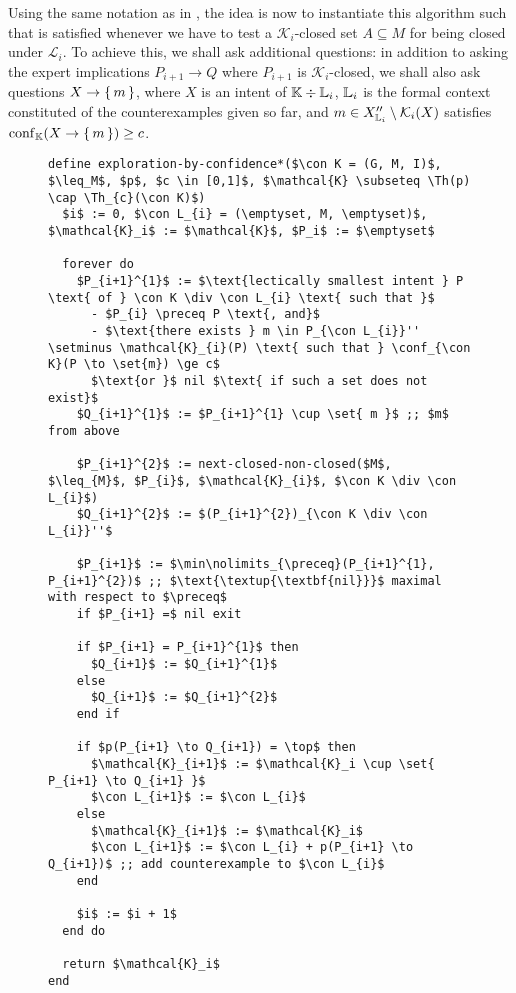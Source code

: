 Using the same notation as in , the idea is
now to instantiate this algorithm such that  is satisfied whenever we have to
test a $\mathcal{K}_{i}$-closed set $A \subseteq M$ for being closed under
$\mathcal{L}_{i}$.  To achieve this, we shall ask additional questions: in addition to
asking the expert implications $P_{i+1} \to Q$ where $P_{i+1}$ is
$\mathcal{K}_{i}$-closed, we shall also ask questions $X \to {\ensuremath{\{\,m\,\}}}$, where $X$ is an
intent of ${\mathbb{K}} \div {\ensuremath{\mathbb{L}}}_{i}$, ${\mathbb{L}}_{i}$ is the formal context constituted of the
counterexamples given so far, and $m \in X_{{\mathbb{L}}_{i}}'' \setminus \mathcal{K}_{i}(X)$
satisfies $\operatorname{conf}_{{\mathbb{K}}}(X \to {\ensuremath{\{\,m\,\}}}) \ge c$.


\begin{figure}[tp]
  \begin{Algorithm}
    \label{alg:exploration-by-confidence-without-Th_c(K)-closures}
    \hspace*{0cm}
\begin{lstlisting}
define exploration-by-confidence*($\con K = (G, M, I)$, $\leq_M$, $p$, $c \in [0,1]$, $\mathcal{K} \subseteq \Th(p) \cap \Th_{c}(\con K)$)
  $i$ := 0, $\con L_{i} = (\emptyset, M, \emptyset)$, $\mathcal{K}_i$ := $\mathcal{K}$, $P_i$ := $\emptyset$

  forever do
    $P_{i+1}^{1}$ := $\text{lectically smallest intent } P \text{ of } \con K \div \con L_{i} \text{ such that }$
      - $P_{i} \preceq P \text{, and}$
      - $\text{there exists } m \in P_{\con L_{i}}'' \setminus \mathcal{K}_{i}(P) \text{ such that } \conf_{\con K}(P \to \set{m}) \ge c$
      $\text{or }$ nil $\text{ if such a set does not exist}$
    $Q_{i+1}^{1}$ := $P_{i+1}^{1} \cup \set{ m }$ ;; $m$ from above

    $P_{i+1}^{2}$ := next-closed-non-closed($M$, $\leq_{M}$, $P_{i}$, $\mathcal{K}_{i}$, $\con K \div \con L_{i}$)
    $Q_{i+1}^{2}$ := $(P_{i+1}^{2})_{\con K \div \con L_{i}}''$

    $P_{i+1}$ := $\min\nolimits_{\preceq}(P_{i+1}^{1}, P_{i+1}^{2})$ ;; $\text{\textup{\textbf{nil}}}$ maximal with respect to $\preceq$
    if $P_{i+1} =$ nil exit

    if $P_{i+1} = P_{i+1}^{1}$ then
      $Q_{i+1}$ := $Q_{i+1}^{1}$
    else
      $Q_{i+1}$ := $Q_{i+1}^{2}$
    end if

    if $p(P_{i+1} \to Q_{i+1}) = \top$ then
      $\mathcal{K}_{i+1}$ := $\mathcal{K}_i \cup \set{ P_{i+1} \to Q_{i+1} }$
      $\con L_{i+1}$ := $\con L_{i}$
    else
      $\mathcal{K}_{i+1}$ := $\mathcal{K}_i$
      $\con L_{i+1}$ := $\con L_{i} + p(P_{i+1} \to Q_{i+1})$ ;; add counterexample to $\con L_{i}$
    end

    $i$ := $i + 1$
  end do

  return $\mathcal{K}_i$  
end
\end{lstlisting}
  \end{Algorithm}
\end{figure}

